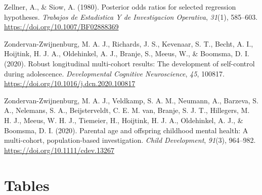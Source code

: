 \documentclass[
]{interact}
\newlength{\cslhangindent}
\newlength{\cslentryspacingunit} %
\newenvironment{CSLReferences}[2] %
 {%
  \setlength{\parindent}{0pt}
  \ifodd #1
  \let\oldpar\par
  \def\par{\hangindent=\cslhangindent\oldpar}
  \fi
  \setlength{\parskip}{#2\cslentryspacingunit}
 }%
 {}
\begin{document}
\begin{CSLReferences}{1}{0}
\leavevmode{}%
Zellner, A., \& Siow, A. (1980). Posterior odds ratios for selected
regression hypotheses. \emph{Trabajos de Estadistica Y de Investigacion
Operativa}, \emph{31}(1), 585--603.
\url{https://doi.org/10.1007/BF02888369}

\leavevmode{}%
Zondervan-Zwijnenburg, M. A. J., Richards, J. S., Kevenaar, S. T.,
Becht, A. I., Hoijtink, H. J. A., Oldehinkel, A. J., Branje, S., Meeus,
W., \& Boomsma, D. I. (2020). Robust longitudinal multi-cohort results:
The development of self-control during adolescence. \emph{Developmental
Cognitive Neuroscience}, \emph{45}, 100817.
\url{https://doi.org/10.1016/j.dcn.2020.100817}

\leavevmode{}%
Zondervan-Zwijnenburg, M. A. J., Veldkamp, S. A. M., Neumann, A.,
Barzeva, S. A., Nelemans, S. A., Beijsterveldt, C. E. M. van, Branje, S.
J. T., Hillegers, M. H. J., Meeus, W. H. J., Tiemeier, H., Hoijtink, H.
J. A., Oldehinkel, A. J., \& Boomsma, D. I. (2020). Parental age and
offspring childhood mental health: A multi-cohort, population-based
investigation. \emph{Child Development}, \emph{91}(3), 964--982.
\url{https://doi.org/10.1111/cdev.13267}

\end{CSLReferences}

\normalsize

\newpage{}

\hypertarget{tables}{%
\section{Tables}\label{tables}}

\begin{table}[h]
\centering
{}
\end{table}
\end{document}
